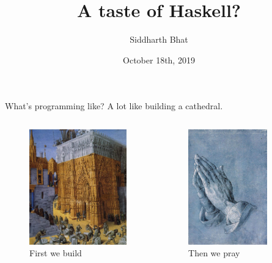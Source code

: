 \documentclass[8pt]{beamer}
\author{Siddharth Bhat}
\date{October 18th, 2019}
\institute{IIIT Open Source Developers group}
\title{A taste of Haskell?}
\begin{document}
\maketitle

\begin{frame}[fragile]{What's programming like?}
    A lot like building a cathedral.
    \pause
    \begin{columns}
    \begin{figure}
    \includegraphics[height=5cm]{./first-we-build.jpg}
    \caption{First we build}
    \end{figure}
    \pause
    \begin{figure}
    \includegraphics[height=5cm]{./then-we-pray.jpg}
    \caption{Then we pray}
    \end{figure}
    \end{columns}
\end{frame}
\end{document}
